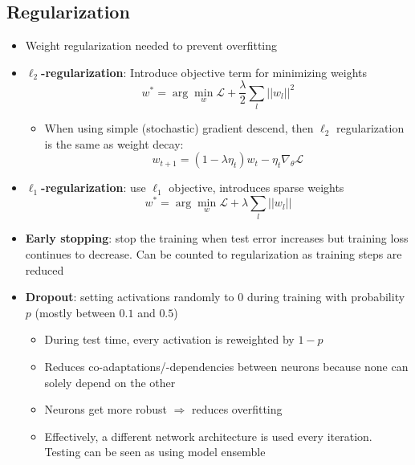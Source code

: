 \subsection{Regularization}
\begin{itemize}
	\item Weight regularization needed to prevent overfitting
	\item \textbf{$\ell_2$-regularization}: Introduce objective term for minimizing weights
	$$w^{*}=\arg\min_w \mathcal{L} + \frac{\lambda}{2}\sum_l ||w_l||^2$$
	\begin{itemize}
		\item When using simple (stochastic) gradient descend, then $\ell_2$ regularization is the same as weight decay: $$w_{t+1} = \left(1-\lambda \eta_t\right) w_{t} - \eta_t \nabla_{\theta} \mathcal{L}$$
	\end{itemize}
	\item \textbf{$\ell_1$-regularization}: use $\ell_1$ objective, introduces sparse weights
	$$w^{*}=\arg\min_w \mathcal{L} + \lambda \sum_l ||w_l||$$
	\item \textbf{Early stopping}: stop the training when test error increases but training loss continues to decrease. Can be counted to regularization as training steps are reduced
	\item \textbf{Dropout}: setting activations randomly to 0 during training with probability $p$ (mostly between $0.1$ and $0.5$)
	\begin{itemize}
		\item During test time, every activation is reweighted by $1 - p$
		\item Reduces co-adaptations/-dependencies between neurons because none can solely depend on the other
		\item Neurons get more robust $\Rightarrow$ reduces overfitting
		\item Effectively, a different network architecture is used every iteration. Testing can be seen as using model ensemble
	\end{itemize}
\end{itemize}
